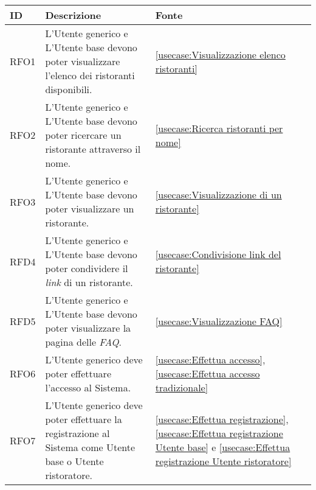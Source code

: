 \begin{table}[H]
	\renewcommand{\arraystretch}{1.5}
	\centering
	\begin{tabularx}{\textwidth}{l|X|p{2cm}}
		\textbf{ID} & \textbf{Descrizione}                                                                                       & \textbf{Fonte}                                                                                                                                               \\
		\hline
		RFO1        & L'Utente generico e L'Utente base devono poter visualizzare l'elenco dei ristoranti disponibili.           & \autoref{usecase:Visualizzazione elenco ristoranti}                                                                                                          \\
		\hline
		RFO2        & L'Utente generico e L'Utente base devono poter ricercare un ristorante attraverso il nome.				  & \autoref{usecase:Ricerca ristoranti per nome}                                                                                                                      \\
		\hline
		RFO3        & L'Utente generico e L'Utente base devono poter visualizzare un ristorante.                                 & \autoref{usecase:Visualizzazione di un ristorante}                                                                                                           \\
		\hline
		RFD4        & L'Utente generico e L'Utente base devono poter condividere il \textit{link} di un ristorante.              & \autoref{usecase:Condivisione link del ristorante}                                                                                                           \\
		\hline
		RFD5        & L'Utente generico e L'Utente base devono poter visualizzare la pagina delle  \textit{\ac{FAQ}}.            & \autoref{usecase:Visualizzazione FAQ}                                                                                                                        \\
		\hline
		RFO6        & L'Utente generico deve poter effettuare l'accesso al Sistema.                                              & \autoref{usecase:Effettua accesso}, \autoref{usecase:Effettua accesso tradizionale}                      \\
		\hline
		RFO7        & L'Utente generico deve poter effettuare la registrazione al Sistema come Utente base o Utente ristoratore. & \autoref{usecase:Effettua registrazione}, \autoref{usecase:Effettua registrazione Utente base} e \autoref{usecase:Effettua registrazione Utente ristoratore} \\

\end{tabularx}
\end{table}
